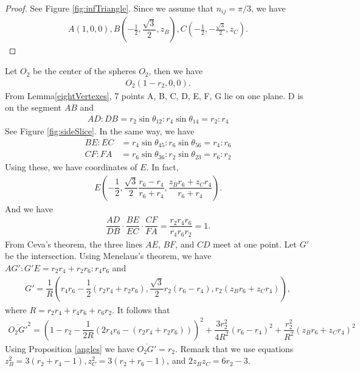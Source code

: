 \documentclass[suppldata, dvipdfmx]{interact}
\theoremstyle{plain}%
\theoremstyle{definition}
\theoremstyle{remark}
\theoremstyle{problemstyle}
\begin{document}
\begin{proof}
See Figure \ref{fig:infTriangle}. Since we assume that $n_{ij} = \pi/3$, we have
\begin{align*}
 A(1, 0, 0), B(-\frac{1}{2}, \dfrac{\sqrt{3}}{2}, z_B), C(-\frac{1}{2}, -\frac{\sqrt{3}}{2}, z_C).
\end{align*}
\end{proof}

Let $O_2$ be the center of the spheres $O_2$, then we have
\begin{align*}
 O_2(1 - r_2, 0, 0).
\end{align*}
From Lemma\ref{eightVertexes}, 7 points A, B, C, D, E, F, G lie on one plane. D is on
the segment $AB$ and
\begin{align*}
 AD : DB = r_2\sin\theta_{12} : r_4\sin\theta_{14} = r_2 : r_4
\end{align*}
See Figure \ref{fig:sideSlice}. In the same way, we have
\begin{align*}
 BE : EC &= r_4\sin\theta_{45} : r_6\sin\theta_{56} = r_4:r_6\\
 CF : FA &= r_6\sin\theta_{36} : r_2\sin\theta_{23} = r_6:r_2
\end{align*}
Using these, we have coordinates of $E$. In fact,
\begin{align*}
 E(-\dfrac{1}{2},\dfrac{\sqrt{3}}{2}\dfrac{r_6-r_4}{r_6 + r_4},
 \dfrac{z_Br_6 + z_C r_4}{r_6 + r_4}).
\end{align*}
And we have
\begin{align*}
 \dfrac{AD}{DB} \cdot \dfrac{BE}{EC} \cdot \dfrac{CF}{FA} = \dfrac{r_2r_4r_6}{r_4r_6r_2} = 1.
\end{align*}
From Ceva's theorem, the three lines $AE$, $BF$, and $CD$ meet at one
point. Let $G'$ be the intersection. Using Menelaus's theorem, we have
$AG':G'E = r_2r_4 + r_2r_6:r_4r_6$ and
\begin{align*}
 G' = \dfrac{1}{R}(r_4r_6 - \dfrac{1}{2}(r_2r_4 + r_2r_6), 
 \dfrac{\sqrt{3}}{2}r_2(r_6 - r_4), r_2(z_Br_6 + z_Cr_4)),
\end{align*}
where $R = r_2r_4 + r_4r_6 + r_6r_2.$ It follows that
\begin{align*}
 \overline{O_2G'}^2 = (1 - r_2 - \dfrac{1}{2R}(2r_4r_6 - (r_2r_4 +
 r_2r_6)))^2 + \dfrac{3r^2_2}{4R^2}(r_6 - r_4)^2 +
 \dfrac{r_2^2}{R^2}(z_Br_6 + z_Cr_4)^2
\end{align*}
Using Proposition \ref{angles} we have $\overline{O_2G'} = r_2$. Remark that we
use equations $z_B^2 = 3(r_2 + r_4 - 1), z_C^2 = 3(r_2 + r_6 - 1)$, and
$2z_Bz_C = 6r_2 - 3$.
\end{document}
